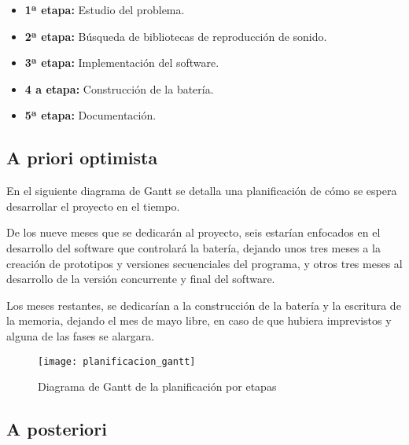             \begin{itemize}
                \item \textbf{1ª etapa:} Estudio del problema.

                \item \textbf{2ª etapa:} Búsqueda de bibliotecas de reproducción de sonido.

                \item \textbf{3ª etapa:} Implementación del software.

                \item \textbf{4 a etapa:} Construcción de la batería.

                \item \textbf{5ª etapa:} Documentación.
            \end{itemize}


        \subsection{A priori optimista} %
        \label{sub:APrioriOptimista}

            En el siguiente diagrama de Gantt se detalla una planificación de cómo se espera desarrollar el proyecto en
            el tiempo.

            De los nueve meses que se dedicarán al proyecto, seis estarían enfocados en el desarrollo del
            software que controlará la batería, dejando unos tres meses a la creación de prototipos y versiones
            secuenciales del programa, y otros tres meses al desarrollo de la versión concurrente y final del software.

            Los meses restantes, se dedicarían a la construcción de la batería y la escritura de la memoria, dejando el
            mes de mayo libre, en caso de que hubiera imprevistos y alguna de las fases se alargara.

            \begin{figure}[ht]
                \centering
                \texttt{[image: planificacion\_gantt]}
                \caption{Diagrama de Gantt de la planificación por etapas\label{fig:PlanificacionGantt}}
            \end{figure}


        \subsection{A posteriori} %
        \label{sub:APosteriori}

